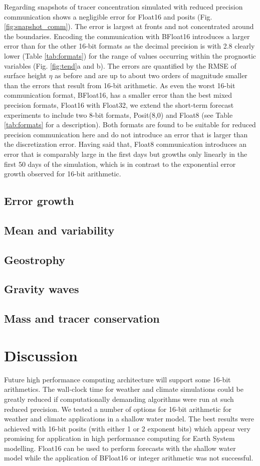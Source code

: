 Regarding snapshots of tracer concentration simulated with reduced precision
communication shows a negligible error for Float16 and posits (Fig. \ref{fig:snapshot_comm}).
The error is largest at fronts and not concentrated around the boundaries.
Encoding the communication with BFloat16 introduces a larger error than for the
other 16-bit formats as the decimal precision is with 2.8 clearly lower
(Table \ref{tab:formats}) for the range of values occurring within the prognostic
variables (Fig. \ref{fig:tend}a and b). The errors are quantified by the RMSE of
surface height $\eta$ as before and are up to about two orders of magnitude smaller
than the errors that result from 16-bit arithmetic. As even the worst 16-bit
communication format, BFloat16, has a smaller error than the best mixed precision
formats, Float16 with Float32, we extend the short-term forecast experiments to
include two 8-bit formats, Posit(8,0) and Float8 (see Table \ref{tab:formats} for
a description). Both formats are found to be suitable for reduced precision
communication here and do not introduce an error that is larger than the
discretization error. Having said that, Float8 communication introduces an error
that is comparably large in the first days but growths only linearly in the first
50 days of the simulation, which is in contrast to the exponential error growth
observed for 16-bit arithmetic.

\subsection{Error growth}
\subsection{Mean and variability}
\subsection{Geostrophy}
\subsection{Gravity waves}
\subsection{Mass and tracer conservation}

\section{Discussion}
Future high performance computing architecture will support some 16-bit
arithmetics. The wall-clock time for weather and climate simulations could
be greatly reduced if computationally demanding algorithms were run at such
reduced precision. We tested a number of options for 16-bit arithmetic for
weather and climate applications in a shallow water model. The best results
were achieved with 16-bit posits (with either 1 or 2 exponent bits) which appear
very promising for application in high performance computing for Earth System
modelling. Float16 can be used to perform forecasts with the shallow water model
while the application of BFloat16 or integer arithmetic was not successful.

